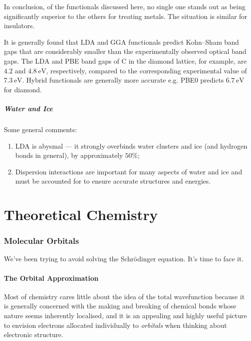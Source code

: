 \documentclass{article}
\theoremstyle{plain}\theoremheaderfont{\normalfont\itshape}\theorembodyfont{\rmfamily}\theoremseparator{.}\newtheorem*{rem}{Remark}\newtheorem*{ex}{Example}\newtheorem*{proof}{Proof}\newtheorem*{altp}{Alternative proof}
\theoremstyle{plain}\theoremheaderfont{\normalfont\bfseries}\theorembodyfont{\rmfamily}\theoremseparator{.}\newtheorem{thm}{Theorem}[section]\newtheorem{lem}[thm]{Lemma}\newtheorem{prop}[thm]{Proposition}\newtheorem*{cor}{Corollary}\newtheorem{defn}[thm]{Definition}\newtheorem{clm}[thm]{Claim}\newtheorem{clminproof}{Claim}\newtheorem{pos}{Postulate}[section]
\theoremstyle{break}\theoremheaderfont{\normalfont\itshape}\theorembodyfont{\rmfamily}\theoremseparator{.\medskip}\newtheorem*{proofskip}{Proof}\newtheorem*{exs}{Examples}\newtheorem*{rems}{Remarks}
\theoremstyle{break}\theoremheaderfont{\normalfont\bfseries}\theorembodyfont{\rmfamily}\theoremseparator{.\medskip}\newtheorem{lemskip}[thm]{Lemma}\newtheorem{defnskip}[thm]{Definition}\newtheorem{propskip}[thm]{Proposition}\newtheorem{thmskip}[thm]{Theorem}
\numberwithin{equation}{section}
\newcommand{\unit}[1]{\ \mathrm{#1}}
\begin{document}
    In conclusion, of the functionals discussed here, no single one stands out as being significantly superior to the others for treating metals. The situation is similar for insulators.

    It is generally found that LDA and GGA functionals predict Kohn--Sham band gaps that are considerably smaller than the experimentally observed optical band gaps. The LDA and PBE band gaps of C in the diamond lattice, for example, are \(4.2\) and \(4.8\unit{eV}\), respectively, compared to the corresponding experimental value of \(7.3\unit{eV}\). Hybrid functionals are generally more accurate e.g. PBE0 predicts \(6.7\unit{eV}\) for diamond.

    \subsubsection{Water and Ice}
    Some general comments:
    \begin{enumerate}[topsep=0pt,label=(\roman*)]
        \item LDA is abysmal --- it strongly overbinds water clusters and ice (and hydrogen bonds in general), by approximately \(50\%\);
        \item Dispersion interactions are important for many aspects of water and ice and must be accounted for to ensure accurate structures and energies.
    \end{enumerate}

    \newpage
    \part{Theoretical Chemistry}
    \section{Molecular Orbitals}
    We've been trying to avoid solving the Schr\"{o}dinger equation. It's time to face it.

    \subsection{The Orbital Approximation}
    Most of chemistry cares little about the idea of the total wavefunction because it is generally concerned with the making and breaking of chemical bonds whose nature seems inherently localised, and it is an appealing and highly useful picture to envision electrons allocated individually to \textit{orbitals} when thinking about electronic structure.
\end{document}
